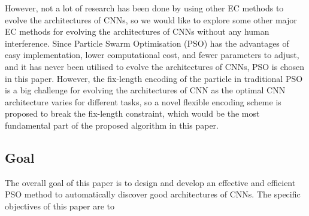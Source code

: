 \documentclass[conference]{IEEEtran}
\begin{document}

However, not a lot of research has been done by using other EC methods to evolve the architectures of CNNs, so we would like to explore some other major EC methods for evolving the architectures of CNNs without any human interference. Since Particle Swarm Optimisation (PSO) has the advantages of easy implementation, lower computational cost, and fewer parameters to adjust, and it has never been utilised to evolve the architectures of CNNs, PSO is chosen in this paper. However, the fix-length encoding of the particle in traditional PSO is a big challenge for evolving the architectures of CNN as the optimal CNN architecture varies for different tasks, so a novel flexible encoding scheme is proposed to break the fix-length constraint, which would be the most fundamental part of the proposed algorithm in this paper.


\subsection{Goal}
The overall goal of this paper is to design and develop an effective and efficient PSO method to automatically discover good architectures of CNNs. The specific objectives of this paper are to
\end{document}

